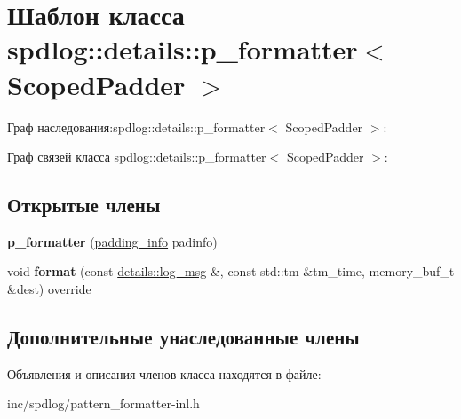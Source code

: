 \hypertarget{classspdlog_1_1details_1_1p__formatter}{}\section{Шаблон класса spdlog\+:\+:details\+:\+:p\+\_\+formatter$<$ Scoped\+Padder $>$}
\label{classspdlog_1_1details_1_1p__formatter}


Граф наследования\+:spdlog\+:\+:details\+:\+:p\+\_\+formatter$<$ Scoped\+Padder $>$\+:


Граф связей класса spdlog\+:\+:details\+:\+:p\+\_\+formatter$<$ Scoped\+Padder $>$\+:
\subsection*{Открытые члены}
\begin{DoxyCompactItemize}
\item 
\mbox{\label{classspdlog_1_1details_1_1p__formatter_a69c06cbc5f9c7cba49b9d3b8d4b55f5b}} 
{\bfseries p\+\_\+formatter} (\hyperlink{structspdlog_1_1details_1_1padding__info}{padding\+\_\+info} padinfo)
\item 
\mbox{\label{classspdlog_1_1details_1_1p__formatter_a6bf3d32e0dbab6ad1df546cb9d3d2120}} 
void {\bfseries format} (const \hyperlink{structspdlog_1_1details_1_1log__msg}{details\+::log\+\_\+msg} \&, const std\+::tm \&tm\+\_\+time, memory\+\_\+buf\+\_\+t \&dest) override
\end{DoxyCompactItemize}
\subsection*{Дополнительные унаследованные члены}


Объявления и описания членов класса находятся в файле\+:\begin{DoxyCompactItemize}
\item 
inc/spdlog/pattern\+\_\+formatter-\/inl.\+h\end{DoxyCompactItemize}
